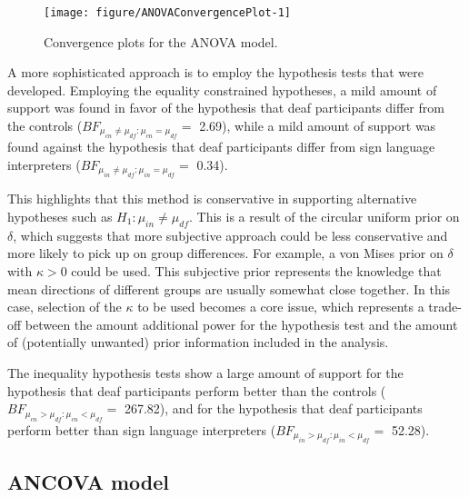 \begin{figure}
\begin{knitrout}
\color{fgcolor}
\texttt{[image: figure/ANOVAConvergencePlot-1]} 

\end{knitrout}
\caption{Convergence plots for the ANOVA model.}
\label{ANOVAConvergencePlot}
\end{figure}


A more sophisticated approach is to employ the hypothesis tests that were developed. Employing the equality constrained hypotheses, a mild amount of support was found in favor of the hypothesis that deaf participants differ from the controls (\( BF_{\mu_{cn} \neq \mu_{df}:\mu_{cn} = \mu_{df}} = \) 2.69), while  a mild amount of support was found against  the hypothesis that deaf participants differ from sign language interpreters  (\( BF_{\mu_{in} \neq \mu_{df}:\mu_{in} = \mu_{df}} = \) 0.34).

This highlights that this method is conservative in supporting alternative hypotheses such as \( H_1 : \mu_{in} \neq \mu_{df}.\) This is a result of the circular uniform prior on \( \delta \), which suggests that more subjective approach could be less conservative and more likely to pick up on group differences. For example, a von Mises prior on \( \delta \) with \( \kappa > 0\) could be used. This subjective prior represents the knowledge that mean directions of different groups are usually somewhat close together. In this case, selection of the \( \kappa \) to be used becomes a core issue, which represents a trade-off between the amount additional power for the hypothesis test and the amount of (potentially unwanted) prior information included in the analysis.

The inequality hypothesis tests show a large amount of support for the hypothesis that deaf participants perform better than the controls (\( BF_{\mu_{cn} > \mu_{df}:\mu_{cn} < \mu_{df}} = \) 267.82), and for the hypothesis that deaf participants perform better than sign language interpreters (\( BF_{\mu_{in} > \mu_{df}:\mu_{in} < \mu_{df}} = \) 52.28).





\subsection{ANCOVA model}




